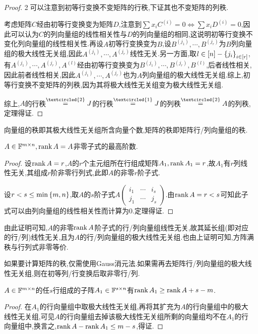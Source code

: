 \documentclass[openany]{book}
\begin{document}
\begin{proof}
    \textcircled{2}可以注意到初等行变换不变矩阵的行秩,下证其也不变矩阵的列秩.

    考虑矩阵$C$经由初等行变换变为矩阵$D$,注意到$\sum x_iC^{(i)}=0\iff \sum x_iD^{(i)}=0$,因此可以认为$C$的列向量组的线性相关性与$D$的列向量组的相同,这说明初等行变换不变化列向量组的线性相关性.再设$A$初等行变换变为$B$,设$B^{(j_1)},\cdots,B^{(j_r)}$为$B$列向量组的极大线性无关组,因此$A^{(j_1)},\cdots,A^{(j_r)}$线性无关.另一方面,取$l\in [n]-\left\{j_i\right\}_{i\in [r]}$,有$A^{(j_1)},\cdots,A^{(j_r)},A^{(l)}$经由初等行变换变为$B^{(j_1)},\cdots,B^{(j_r)},B^{(l)}$,后者线性相关,因此前者线性相关,因此$A^{(j_1)},\cdots,A^{(j_r)}$也为$A$列向量组的极大线性无关组.综上,初等行变换不变矩阵的列秩,因为其将极大线性无关组变为极大线性无关组.

    综上,$A$的行秩$\overset{\textcircled{2}}{=}J$的行秩$\overset{\textcircled{1}}{=}J$的列秩$\overset{\textcircled{2}}{=}A$的列秩,定理得证.
\end{proof}
\begin{definition}[秩]
    向量组的秩即其极大线性无关组所含向量个数,矩阵的秩即矩阵行/列向量组的秩.
\end{definition}

\begin{theorem}\label{thm1}
    $A\in \mathbb{F}^{m\times n}, \operatorname{rank} A=A$非零子式的最高阶数.
\end{theorem}
\begin{proof}
    设$\operatorname{rank} A=r$,$A$的$r$个主元组所在行组成矩阵$A_1,\operatorname{rank} A_1=r$,故$A_1$有$r$列线性无关,其组成$r$阶非零行列式,此即$A$的非零$r$阶子式.

    设$r<s\leq \min\left\{m,n\right\}$,取$A$的$s$阶子式$A\begin{pmatrix}
        i_1&\cdots&i_s\\j_1&\cdots&j_s
    \end{pmatrix}$.由$\operatorname{rank} A=r<s$可知此子式可以由列向量组的线性相关性而计算为0.定理得证.
\end{proof}
由此证明可知,$A$的非零$\operatorname{rank} A$阶子式的行/列向量组线性无关,故其延长组(即对应的行/列)线性无关,且为$A$的行/列向量组的极大线性无关组.也由上证明可知,方阵满秩与行列式非零等价.

\begin{example}
    如果要计算矩阵的秩,仅需使用Gauss消元法.如果需再去矩阵行/列向量组的极大线性无关组,则在初等列/行变换后取非零行/列.
\end{example}

\begin{proposition}
    $A\in\mathbb{F}^{m\times n}$的任$s$行组成的子阵$A_1\in \mathbb{F}^{s\times n}$有$\operatorname{rank} A_1\geq \operatorname{rank} A+s-m$.
\end{proposition}
\begin{proof}
    在$A_1$的行向量组中取极大线性无关组,再将其扩充为$A$的行向量组中的极大线性无关组,可见$A$的行向量组去掉该极大线性无关组所剩的向量组均不在$A_1$的行向量组中,换言之,$\operatorname{rank} A-\operatorname{rank} A_1\leq m-s$,得证.
\end{proof}
\end{document}
